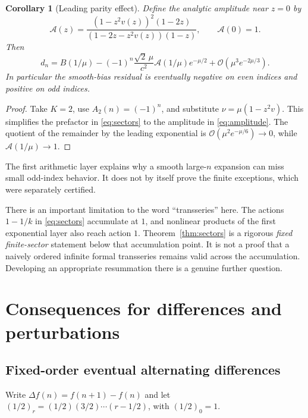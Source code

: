 \documentclass[11pt]{article}
\numberwithin{equation}{section}
\newtheorem{corollary}[theorem]{Corollary}
\theoremstyle{definition}
\theoremstyle{remark}
\newcommand{\OO}{\mathcal O}
\begin{document}
\begin{corollary}[Leading parity effect]\label{cor:parity}
Define the analytic amplitude near $z=0$ by
\begin{equation}\label{eq:amplitude}
 \mathcal A(z)=
 \frac{(1-z^2v(z))^2(1-2z)}
 {(1-2z-z^2v(z))(1-z)},\qquad\mathcal A(0)=1.
\end{equation}
Then
\begin{equation}\label{eq:parity}
 d_n=B(1/\mu)
 -(-1)^n\frac{\sqrt2\,\mu}{c^2}
 \mathcal A(1/\mu)e^{-\mu/2}
 +\OO(\mu^3e^{-2\mu/3}).
\end{equation}
In particular the smooth-bias residual is eventually negative on even
indices and positive on odd indices.
\end{corollary}
\begin{proof}
Take $K=2$, use $A_2(n)=(-1)^n$, and substitute
$\nu=\mu(1-z^2v)$. This simplifies the prefactor in
\eqref{eq:sectors} to the amplitude in \eqref{eq:amplitude}.
The quotient of the remainder by the leading exponential is
$\OO(\mu^2e^{-\mu/6})\to0$, while $\mathcal A(1/\mu)\to1$.
\end{proof}

The first arithmetic layer explains why a smooth large-$n$ expansion
can miss small odd-index behavior. It does not by itself prove the
finite exceptions, which were separately certified.

There is an important limitation to the word ``transseries'' here.
The actions $1-1/k$ in \eqref{eq:sectors} accumulate at $1$, and
nonlinear products of the first exponential layer also reach action
$1$. Theorem~\ref{thm:sectors} is a rigorous \emph{fixed finite-sector}
statement below that accumulation point. It is not a proof that a
naively ordered infinite formal transseries remains valid across the
accumulation. Developing an appropriate resummation there is a genuine
further question.

\section{Consequences for differences and perturbations}\label{sec:consequences}
\subsection{Fixed-order eventual alternating differences}
Write $\Delta f(n)=f(n+1)-f(n)$ and let
$(1/2)_r=(1/2)(3/2)\cdots(r-1/2)$, with $(1/2)_0=1$.
\end{document}
